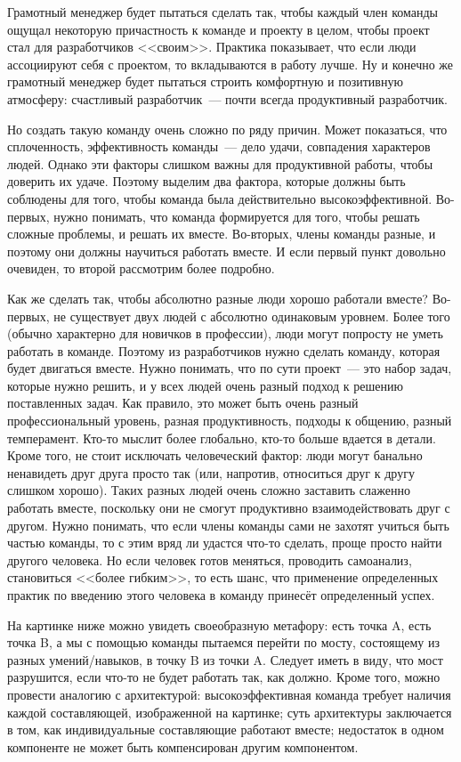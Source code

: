 \documentclass{../../text-style}
\begin{document}
Грамотный менеджер будет пытаться сделать так, чтобы каждый член команды ощущал некоторую причастность к команде и проекту в целом, чтобы проект стал для разработчиков <<своим>>. Практика показывает, что если люди ассоциируют себя с проектом, то вкладываются в работу лучше. Ну и конечно же грамотный менеджер будет пытаться строить комфортную и позитивную атмосферу: счастливый разработчик~--- почти всегда продуктивный разработчик.

Но создать такую команду очень сложно по ряду причин. Может показаться, что сплоченность, эффективность команды~--- дело удачи, совпадения характеров людей. Однако эти факторы слишком важны для продуктивной работы, чтобы доверить их удаче. Поэтому выделим два фактора, которые должны быть соблюдены для того, чтобы команда была действительно высокоэффективной. Во-первых, нужно понимать, что команда формируется для того, чтобы решать сложные проблемы, и решать их вместе. Во-вторых, члены команды разные, и поэтому они должны научиться работать вместе. И если первый пункт довольно очевиден, то второй рассмотрим более подробно.

Как же сделать так, чтобы абсолютно разные люди хорошо работали вместе? Во-первых, не существует двух людей с абсолютно одинаковым уровнем. Более того (обычно характерно для новичков в профессии), люди могут попросту не уметь работать в команде. Поэтому из разработчиков нужно сделать команду, которая будет двигаться вместе. Нужно понимать, что по сути проект~--- это набор задач, которые нужно решить, и у всех людей очень разный подход к решению поставленных задач. Как правило, это может быть очень разный профессиональный уровень, разная продуктивность, подходы к общению, разный темперамент. Кто-то мыслит более глобально, кто-то больше вдается в детали. Кроме того, не стоит исключать человеческий фактор: люди могут банально ненавидеть друг друга просто так (или, напротив, относиться друг к другу слишком хорошо). Таких разных людей очень сложно заставить слаженно работать вместе, поскольку они не смогут продуктивно взаимодействовать друг с другом. Нужно понимать, что если члены команды сами не захотят учиться быть частью команды, то с этим вряд ли удастся что-то сделать, проще просто найти другого человека. Но если человек готов меняться, проводить самоанализ, становиться <<более гибким>>, то есть шанс, что применение определенных практик по введению этого человека в команду принесёт определенный успех.

На картинке ниже можно увидеть своеобразную метафору: есть точка A, есть точка B, а мы с помощью команды пытаемся перейти по мосту, состоящему из разных умений/навыков, в точку B из точки A. Следует иметь в виду, что мост разрушится, если что-то не будет работать так, как должно. Кроме того, можно провести аналогию с архитектурой: высокоэффективная команда требует наличия каждой составляющей, изображенной на картинке; суть архитектуры заключается в том, как индивидуальные составляющие работают вместе; недостаток в одном компоненте не может быть компенсирован другим компонентом.
\end{document}
